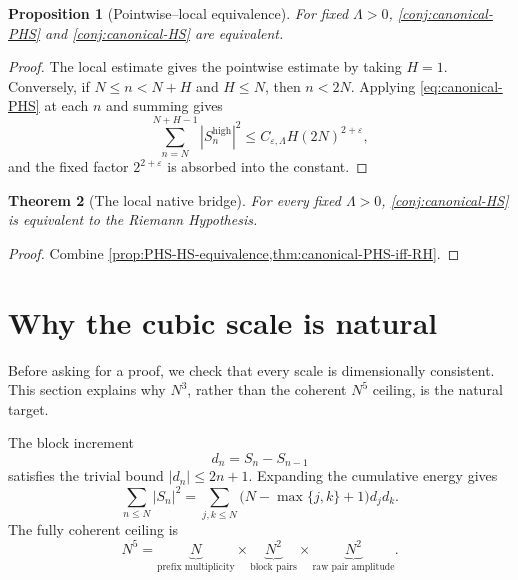 \documentclass[11pt]{article}
\newtheorem{theorem}{Theorem}[section]
\newtheorem{proposition}[theorem]{Proposition}
\theoremstyle{definition}
\newcommand{\eps}{\varepsilon}
\newcommand{\1}{\mathbf{1}}
\begin{document}
\begin{proposition}[Pointwise--local equivalence]
\label{prop:PHS-HS-equivalence}
For fixed $\Lambda>0$, \cref{conj:canonical-PHS} and \cref{conj:canonical-HS} are equivalent.
\end{proposition}

\begin{proof}
The local estimate gives the pointwise estimate by taking $H=1$.  Conversely, if $N\le n<N+H$ and $H\le N$, then $n<2N$.  Applying \cref{eq:canonical-PHS} at each $n$ and summing gives
\[
 \sum_{n=N}^{N+H-1}|S_n^{\mathrm{high}}|^2
 \le C_{\eps,\Lambda}H(2N)^{2+\eps},
\]
and the fixed factor $2^{2+\eps}$ is absorbed into the constant.
\end{proof}

\begin{theorem}[The local native bridge]
\label{thm:canonical-HS-iff-RH}
For every fixed $\Lambda>0$, \cref{conj:canonical-HS} is equivalent to the Riemann Hypothesis.
\end{theorem}

\begin{proof}
Combine \cref{prop:PHS-HS-equivalence,thm:canonical-PHS-iff-RH}.
\end{proof}

\section{Why the cubic scale is natural}
\label{sec:exponent-accounting}

Before asking for a proof, we check that every scale is dimensionally consistent.  This section explains why $N^3$, rather than the coherent $N^5$ ceiling, is the natural target.

The block increment
\begin{equation}
 d_n=S_n-S_{n-1}
 \label{eq:d-n}
\end{equation}
satisfies the trivial bound $|d_n|\le2n+1$.  Expanding the cumulative energy gives
\begin{equation}
 \sum_{n\le N}|S_n|^2
 =
 \sum_{j,k\le N}
 \bigl(N-\max\{j,k\}+1\bigr)d_jd_k.
 \label{eq:triangular-energy}
\end{equation}
The fully coherent ceiling is
\begin{equation}
 N^5
 =
 \underbrace{N}_{\text{prefix multiplicity}}
 \times
 \underbrace{N^2}_{\text{block pairs}}
 \times
 \underbrace{N^2}_{\text{raw pair amplitude}}.
 \label{eq:N5-accounting}
\end{equation}
\end{document}
